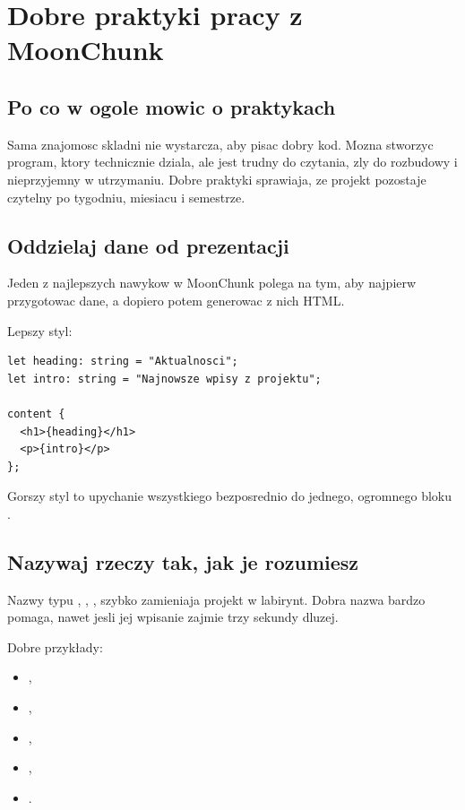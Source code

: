 \chapter{Dobre praktyki pracy z MoonChunk}

\section{Po co w ogole mowic o praktykach}
Sama znajomosc skladni nie wystarcza, aby pisac dobry kod. Mozna stworzyc program, ktory
technicznie dziala, ale jest trudny do czytania, zly do rozbudowy i nieprzyjemny w
utrzymaniu. Dobre praktyki sprawiaja, ze projekt pozostaje czytelny po tygodniu,
miesiacu i semestrze.

\section{Oddzielaj dane od prezentacji}
Jeden z najlepszych nawykow w MoonChunk polega na tym, aby najpierw przygotowac dane,
a dopiero potem generowac z nich HTML.

Lepszy styl:

\begin{lstlisting}[style=moonchunk,caption={Najpierw dane, potem content}]
let heading: string = "Aktualnosci";
let intro: string = "Najnowsze wpisy z projektu";

content {
  <h1>{heading}</h1>
  <p>{intro}</p>
};
\end{lstlisting}

Gorszy styl to upychanie wszystkiego bezposrednio do jednego, ogromnego bloku .

\section{Nazywaj rzeczy tak, jak je rozumiesz}
Nazwy typu , , ,  szybko zamieniaja projekt w
labirynt. Dobra nazwa bardzo pomaga, nawet jesli jej wpisanie zajmie trzy sekundy dluzej.

Dobre przykłady:

\begin{itemize}
  \item {},
  \item {},
  \item {},
  \item {},
  \item {}.
\end{itemize}

